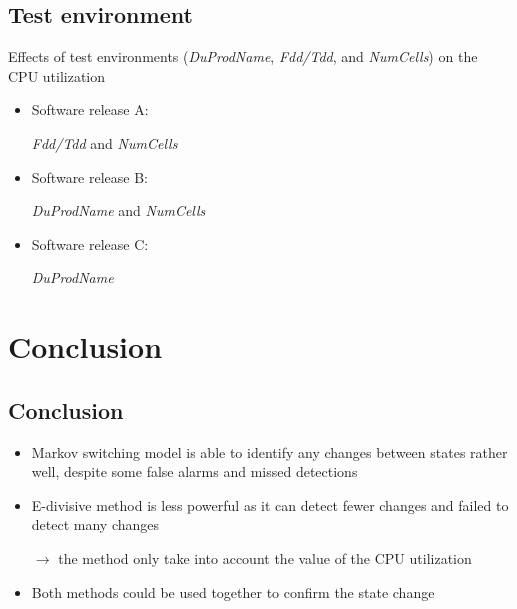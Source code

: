\documentclass{beamer}
\begin{document}
\subsection{Test environment}
\begin{frame}[fragile]
Effects of test environments \footnotesize{(\textit{DuProdName}, \textit{Fdd/Tdd}, and \textit{NumCells})} \normalsize{on the CPU utilization}

\begin{itemize}
	\item Software release A:
	
	\textit{Fdd/Tdd} and \textit{NumCells}
	
	\item Software release B:
	
	\textit{DuProdName} and \textit{NumCells}
	
	\item Software release C:
	
	\textit{DuProdName}

\end{itemize}
\end{frame}

\section{Conclusion}
\subsection{Conclusion}
\begin{frame}
\begin{itemize}
	\item Markov switching model is able to identify any changes between states rather well, despite some false alarms and missed detections
	\item E-divisive method  is less powerful as it can detect fewer changes and failed to detect many changes
	
	$\rightarrow$ the method only take into account the value of the CPU utilization
	
	\item Both methods could be used together to confirm the state change
\end{itemize}
\end{frame}

\end{document}
